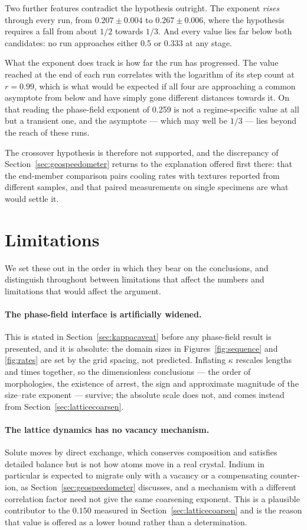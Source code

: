 \documentclass[preprint,12pt,authoryear]{elsarticle}
\begin{document}
Two further features contradict the hypothesis outright. The exponent
\emph{rises} through every run, from $0.207 \pm 0.004$ to $0.267 \pm 0.006$,
where the hypothesis requires a fall from about $1/2$ towards $1/3$. And every
value lies far below both candidates: no run approaches either 0.5 or 0.333 at
any stage.

What the exponent does track is how far the run has progressed. The value
reached at the end of each run correlates with the logarithm of its step count
at $r = 0.99$, which is what would be expected if all four are approaching a
common asymptote from below and have simply gone different distances towards
it. On that reading the phase-field exponent of 0.259 is not a regime-specific
value at all but a transient one, and the asymptote --- which may well be
$1/3$ --- lies beyond the reach of these runs.

The crossover hypothesis is therefore not supported, and the discrepancy of
Section~\ref{sec:geospeedometer} returns to the explanation offered first
there: that the end-member comparison pairs cooling rates with textures
reported from different samples, and that paired measurements on single
specimens are what would settle it.

\section{Limitations}
\label{sec:limitations}

We set these out in the order in which they bear on the conclusions, and
distinguish throughout between limitations that affect the numbers and
limitations that would affect the argument.

\paragraph{The phase-field interface is artificially widened.} This is stated
in Section~\ref{sec:kappacaveat} before any phase-field result is presented, and
it is absolute: the domain sizes in Figures~\ref{fig:sequence} and
\ref{fig:rates} are set by the grid spacing, not predicted. Inflating $\kappa$
rescales lengths and times together, so the dimensionless conclusions --- the
order of morphologies, the existence of arrest, the sign and approximate
magnitude of the size--rate exponent --- survive; the absolute scale does not,
and comes instead from Section~\ref{sec:latticecoarsen}.

\paragraph{The lattice dynamics has no vacancy mechanism.} Solute moves by
direct exchange, which conserves composition and satisfies detailed balance but
is not how atoms move in a real crystal. Indium in particular is expected to
migrate only with a vacancy or a compensating counter-ion, as
Section~\ref{sec:geospeedometer} discusses, and a mechanism with a different
correlation factor need not give the same coarsening exponent. This is a
plausible contributor to the $0.150$ measured in Section~\ref{sec:latticecoarsen}
and is the reason that value is offered as a lower bound rather than a
determination.
\end{document}
